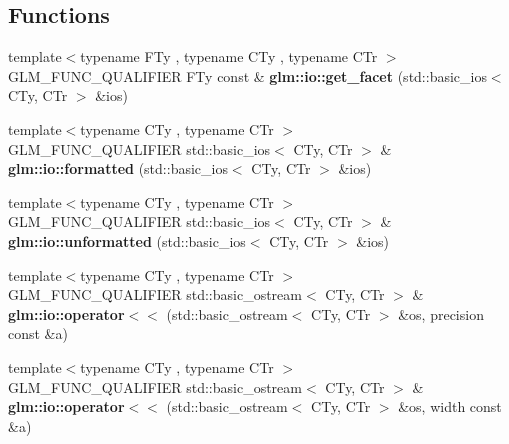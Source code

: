 \subsection*{Functions}
\begin{DoxyCompactItemize}
\item 
\mbox{\label{io_8inl_a9e8927cf032254b0eee4ec650286e1f9}} 
{\footnotesize template$<$typename F\+Ty , typename C\+Ty , typename C\+Tr $>$ }\\G\+L\+M\+\_\+\+F\+U\+N\+C\+\_\+\+Q\+U\+A\+L\+I\+F\+I\+ER F\+Ty const  \& {\bfseries glm\+::io\+::get\+\_\+facet} (std\+::basic\+\_\+ios$<$ C\+Ty, C\+Tr $>$ \&ios)
\item 
\mbox{\label{io_8inl_aa31ec433f6039e5bd35f0f58b37bef83}} 
{\footnotesize template$<$typename C\+Ty , typename C\+Tr $>$ }\\G\+L\+M\+\_\+\+F\+U\+N\+C\+\_\+\+Q\+U\+A\+L\+I\+F\+I\+ER std\+::basic\+\_\+ios$<$ C\+Ty, C\+Tr $>$ \& {\bfseries glm\+::io\+::formatted} (std\+::basic\+\_\+ios$<$ C\+Ty, C\+Tr $>$ \&ios)
\item 
\mbox{\label{io_8inl_a8f950faa7ad67cac1287beaf896a8bb6}} 
{\footnotesize template$<$typename C\+Ty , typename C\+Tr $>$ }\\G\+L\+M\+\_\+\+F\+U\+N\+C\+\_\+\+Q\+U\+A\+L\+I\+F\+I\+ER std\+::basic\+\_\+ios$<$ C\+Ty, C\+Tr $>$ \& {\bfseries glm\+::io\+::unformatted} (std\+::basic\+\_\+ios$<$ C\+Ty, C\+Tr $>$ \&ios)
\item 
\mbox{\label{io_8inl_ac52a8c5f8ea189f5bae2e5b8e382675f}} 
{\footnotesize template$<$typename C\+Ty , typename C\+Tr $>$ }\\G\+L\+M\+\_\+\+F\+U\+N\+C\+\_\+\+Q\+U\+A\+L\+I\+F\+I\+ER std\+::basic\+\_\+ostream$<$ C\+Ty, C\+Tr $>$ \& {\bfseries glm\+::io\+::operator$<$$<$} (std\+::basic\+\_\+ostream$<$ C\+Ty, C\+Tr $>$ \&os, precision const \&a)
\item 
\mbox{\label{io_8inl_ac4783e4e3b0384619625d5d2d00c27b8}} 
{\footnotesize template$<$typename C\+Ty , typename C\+Tr $>$ }\\G\+L\+M\+\_\+\+F\+U\+N\+C\+\_\+\+Q\+U\+A\+L\+I\+F\+I\+ER std\+::basic\+\_\+ostream$<$ C\+Ty, C\+Tr $>$ \& {\bfseries glm\+::io\+::operator$<$$<$} (std\+::basic\+\_\+ostream$<$ C\+Ty, C\+Tr $>$ \&os, width const \&a)
\item 

\end{DoxyCompactItemize}
